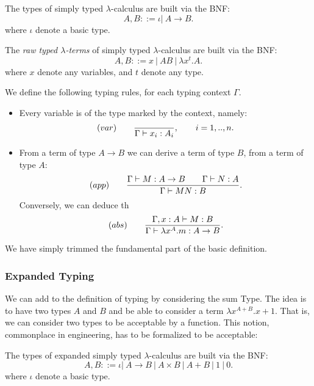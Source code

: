 \begin{definition}
  The types of simply typed $\lambda$-calculus are built via the BNF:
  $$A,B ::= \iota |\ A\to B.$$
  where $\iota$ denote a basic type. 
\end{definition}



\begin{definition}
  The \emph{raw typed $\lambda$-terms} of simply typed $\lambda$-calculus are built via the BNF:
  $$A,B ::= x\ |\ AB\ |\ \lambda x^t.A.$$
  where $x$ denote any variables, and $t$ denote any type. 
\end{definition}



\begin{definition}\label{def:typing-rules}
  We define the following typing rules, for each typing context $\Gamma$.
  \begin{itemize}
    \item Every variable is of the type marked by the context, namely:
$$  (var)\qquad  {\displaystyle \over \Gamma \vdash x_i:A_i},\qquad  i=  1,..,n.$$

\item From a term of type $A\to B$ we can derive a term of type $B$, from a term of type $A$:
  $$(app)\qquad  {\displaystyle \Gamma \vdash M:A\to B\qquad \Gamma \vdash N:A      \over \Gamma \vdash MN:B}.$$
  Conversely, we can deduce th
  $$(abs)\qquad  {\displaystyle \Gamma, x: A\vdash M: B  \over \Gamma \vdash \lambda x^A.m:A\to B}.$$
  \end{itemize}
\end{definition}

\begin{remark}
  We have simply trimmed the fundamental part of the basic definition.
\end{remark}
\subsubsection{Expanded Typing}
We can add to the definition of typing by considering the sum Type. The idea is to have two types $A$ and $B$ and be able to consider a term $\lambda x^{A+B}. x+1$. That is, we can consider two types to be acceptable by a function. This notion, commonplace in engineering, has to be formalized to be acceptable:

\begin{definition}
  The types of expanded simply typed $\lambda$-calculus are built via the BNF:
  $$A,B ::= \iota |\ A\to B\ |\ A \times B \ |\ A + B  \ |\ 1\ |\ 0.$$
  where $\iota$ denote a basic type. 
\end{definition}

